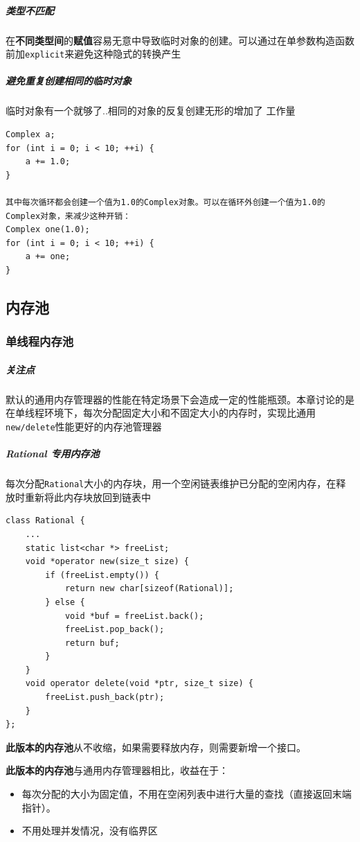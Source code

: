 \documentclass[UTF8,a4paper,12pt]{ctexbook}
\begin{document}
			\subparagraph{类型不匹配} 在\textbf{不同类型间}的\textbf{赋值}容易无意中导致临时对象的创建。可以通过在单参数构造函数前加\verb|explicit|来避免这种隐式的转换产生
			
			\subparagraph{避免重复创建相同的临时对象} 临时对象有一个就够了..相同的对象的反复创建无形的增加了 工作量
				\begin{lstlisting}
Complex a;
for (int i = 0; i < 10; ++i) {
	a += 1.0;
}

其中每次循环都会创建一个值为1.0的Complex对象。可以在循环外创建一个值为1.0的Complex对象，来减少这种开销：
Complex one(1.0);
for (int i = 0; i < 10; ++i) {
	a += one;
}
				\end{lstlisting}
		\subsection{内存池}
			\subsubsection{单线程内存池}
				\subparagraph{关注点} 默认的通用内存管理器的性能在特定场景下会造成一定的性能瓶颈。本章讨论的是在单线程环境下，每次分配固定大小和不固定大小的内存时，实现比通用\verb|new/delete|性能更好的内存池管理器
				
				\subparagraph{Rational 专用内存池} 每次分配\verb|Rational|大小的内存块，用一个空闲链表维护已分配的空闲内存，在释放时重新将此内存块放回到链表中
				
				\begin{lstlisting}
class Rational {
	...
	static list<char *> freeList;
	void *operator new(size_t size) {
		if (freeList.empty()) {
			return new char[sizeof(Rational)];
		} else {
			void *buf = freeList.back();
			freeList.pop_back();
			return buf;
		}
	}
	void operator delete(void *ptr, size_t size) {
		freeList.push_back(ptr);
	}
};
				\end{lstlisting}
				
				\textbf{此版本的内存池}从不收缩，如果需要释放内存，则需要新增一个接口。
				
				\textbf{此版本的内存池}与通用内存管理器相比，收益在于：
					\begin{itemize}[itemindent = 1em]
						\item 每次分配的大小为固定值，不用在空闲列表中进行大量的查找（直接返回末端指针）。
						\item 不用处理并发情况，没有临界区						
					\end{itemize}
				
\end{document}
